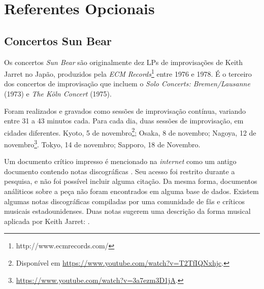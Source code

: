 \section{Referentes Opcionais}\label{sec:sunbear}

\subsection{Concertos Sun Bear}\label{sec:sunbearanal}

Os concertos \emph{Sun Bear} são originalmente dez LPs  de improvisações de Keith Jarret no Japão, produzidos pela \emph{ECM Records}\footnote{http://www.ecmrecords.com/} entre 1976 e 1978. É o terceiro dos concertos de improvisação que incluem o \emph{Solo Concerts: Bremen/Lausanne} (1973) e \emph{The Köln Concert} (1975).

Foram realizados e gravados como sessões de improvisação contínua, variando entre 31 a 43 minutos cada. Para cada dia, duas sessões de improvisação, em cidades diferentes. Kyoto, 5 de novembro\footnote{Disponível em \url{https://www.youtube.com/watch?v=T2TfIQNxhjc}.}; Osaka, 8 de novembro; Nagoya, 12 de novembro\footnote{\url{https://www.youtube.com/watch?v=3a7ezm3D1jA}.}. Tokyo, 14 de novembro; Sapporo, 18 de Novembro.


Um documento crítico impresso é mencionado na \emph{internet} como um antigo documento contendo notas discográficas \cite{rollingstone1985}. Seu acesso foi restrito durante a pesquisa, e não foi possível incluir alguma citação. Da mesma forma, documentos análiticos sobre a peça não foram encontrados em alguma base de dados. Existem algumas notas discográficas compiladas por uma comunidade de fãs e críticos musicais estadounidenses. Duas notas sugerem uma descrição da forma musical aplicada por Keith Jarret: \cite[p.~129]{jarret_discography_2014}. 

